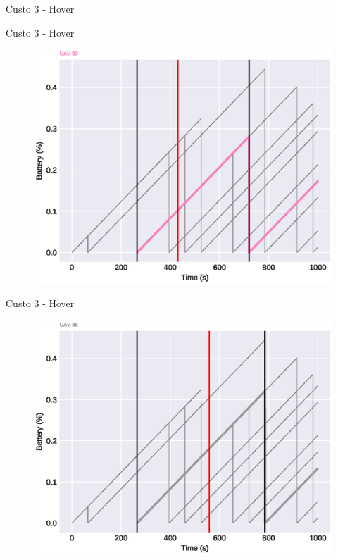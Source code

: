 \begin{frame}{Custo 3 - Hover}
\begin{figure}[!htb]
                 \end{figure}
            \end{frame}\begin{frame}{Custo 3 - Hover}
                \begin{figure}[!htb]
                     \includegraphics[width=\textwidth]{custo_3/uav_hover_acum_uav_7.eps}
                 \end{figure}
            \end{frame}\begin{frame}{Custo 3 - Hover}
                \begin{figure}[!htb]
                     \includegraphics[width=\textwidth]{custo_3/uav_hover_acum_uav_9.eps}

\end{figure}
\end{frame}
